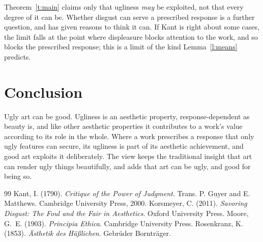 \documentclass{situationist-preprint}
\begin{document}
\begin{reply}
Theorem~\ref{t:main} claims only that ugliness \emph{may} be exploited, not that every degree of it can be. Whether disgust can serve a prescribed response is a further question, and \citet{Korsmeyer2011} has given reasons to think it can. If Kant is right about some cases, the limit falls at the point where displeasure blocks attention to the work, and so blocks the prescribed response; this is a limit of the kind Lemma~\ref{l:means} predicts.
\end{reply}

\section{Conclusion}

Ugly art can be good. Ugliness is an aesthetic property, response-dependent as beauty is, and like other aesthetic properties it contributes to a work's value according to its role in the whole. Where a work prescribes a response that only ugly features can secure, its ugliness is part of its aesthetic achievement, and good art exploits it deliberately. The view keeps the traditional insight that art can render ugly things beautifully, and adds that art can be ugly, and good for being so.

\begin{thebibliography}{99}\small
{} Kant, I. (1790). \emph{Critique of the Power of Judgment}. Trans. P. Guyer and E. Matthews. Cambridge University Press, 2000.
 Korsmeyer, C. (2011). \emph{Savoring Disgust: The Foul and the Fair in Aesthetics}. Oxford University Press.
 Moore, G.~E. (1903). \emph{Principia Ethica}. Cambridge University Press.
 Rosenkranz, K. (1853). \emph{Ästhetik des Häßlichen}. Gebrüder Bornträger.
\end{thebibliography}
\end{document}
